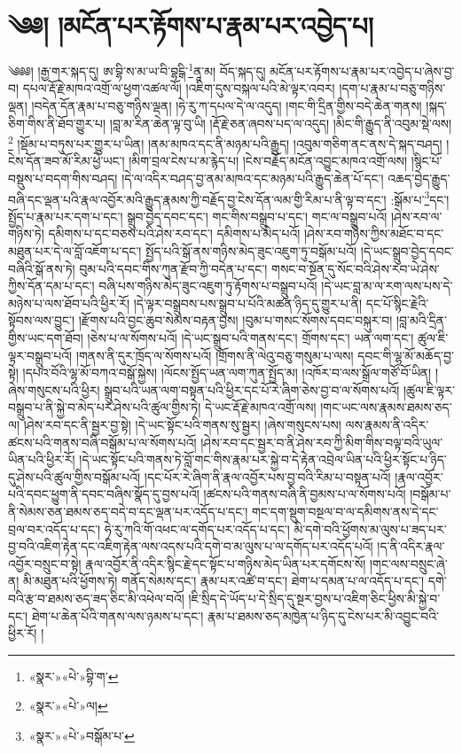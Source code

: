 \chapter{༄༅། །མངོན་པར་རྟོགས་པ་རྣམ་པར་འབྱེད་པ།}༄༅༅། །རྒྱ་གར་སྐད་དུ། ཨ་བྷི་ས་མ་ཡ་བི་བྷངྒི་\footnote{«སྣར་»«པེ་»བྷི་ག་}ནཱ་མ། བོད་སྐད་དུ། མངོན་པར་རྟོགས་པ་རྣམ་པར་འབྱེད་པ་ཞེས་བྱ་བ། དཔལ་རྡོ་རྗེ་མཁའ་འགྲོ་ལ་ཕྱག་འཚལ་ལོ། །འཇིག་དུས་བསྐལ་པའི་མེ་ལྟར་འབར། །དག་པ་རྣམ་པ་བཅུ་གཉིས་ལྡན། །བདེན་དོན་རྣམ་པ་བཅུ་གཉིས་ལྡན། །ཧེ་རུ་ཀ་དཔལ་དེ་ལ་འདུད། །གང་གི་དྲིན་གྱིས་བདེ་ཆེན་གནས། །སྐད་ཅིག་གིས་ནི་ཐོབ་གྱུར་པ། །བླ་མ་རིན་ཆེན་ལྟ་བུ་ཡི། །རྡོ་རྗེ་ཅན་ཞབས་པད་ལ་འདུད། །མིང་གི་རྒྱུད་ནི་འབུམ་སྡེ་ལས།\footnote{«སྣར་»«པེ་»ལ།} །སྡོམ་པ་བཏུས་པར་གྱུར་པ་ཡིན། །ནམ་མཁའ་དང་ནི་མཉམ་པའི་རྒྱུད། །འབུམ་གཅིག་ནང་ནས་དེ་སྐད་བཤད། །ངེས་དོན་ཟབ་མོ་རིམ་ཕྱེ་ཡང་། །མིག་བྲལ་ངེས་པ་མ་རྙེད་པ། །ངེས་བརྗོད་མངོན་འབྱུང་མཁའ་འགྲོ་ལས། །སྙིང་པོ་བསྡུས་པ་བདག་གིས་བཤད། །དེ་ལ་འདིར་བཤད་བྱ་ནམ་མཁའ་དང་མཉམ་པའི་རྒྱུད་ཆེན་པོ་དང་། འཆད་བྱེད་རྒྱུད་བཞི་དང་ལྡན་པའི་རྣལ་འབྱོར་མའི་རྒྱུད་རྣམས་ཀྱི་བརྗོད་བྱ་ངེས་དོན་ལམ་གྱི་རིམ་པ་ནི་ལྟ་བ་དང་། :སྒོམ་པ་\footnote{«སྣར་»«པེ་»བསྒོམ་པ་}དང་། སྤྱོད་པ་རྣམ་པར་དག་པ་དང་། སྒྲུབ་བྱེད་དབང་དང་། གང་གིས་བསྒྲུབ་པ་དང་། གང་ལ་བསྒྲུབ་པའོ། །ཤེས་རབ་ལ་གཉིས་ཏེ། དམིགས་པ་དང་བཅས་པའི་ཤེས་རབ་དང་། དམིགས་པ་མེད་པའོ། །ཤེས་རབ་གཉིས་ཀྱིས་མཐོང་བ་དང་མཐུན་པར་དེ་ལ་བློ་འཇོག་པ་དང་། སྤྱོད་པའི་སྒོ་ནས་གཉིས་མེད་ཟུང་འཇུག་ཏུ་བསྒོམ་པའོ། །དེ་ཡང་སྒྲུབ་བྱེད་དབང་བཞིའི་སྒོ་ནས་ཏེ། བུམ་པའི་དབང་གིས་ཀུན་རྫོབ་ཀྱི་བདེན་པ་དང་། གསང་བ་སྔོན་དུ་སོང་བའི་ཤེས་རབ་ཡེ་ཤེས་ཀྱིས་དོན་དམ་པ་དང་། བཞི་པས་གཉིས་མེད་ཟུང་འཇུག་ཏུ་རྟོགས་པ་བསྒྲུབ་པའོ། །དེ་ཡང་བླ་མ་ལ་རག་ལས་པས་དེ་མཉེས་པ་ལས་ཐོབ་པའི་ཕྱིར་རོ། །དེ་ལྟར་བསྒྲུབས་པས་སྒྲུབ་པ་པོའི་མཚན་ཉིད་དུ་གྱུར་པ་ནི། དང་པོ་སྙིང་རྗེའི་སྟོབས་ལས་བྱུང་། །རྫོགས་པའི་བྱང་ཆུབ་སེམས་བརྟན་བྱས། །བུམ་པ་གསང་སོགས་དབང་བསྐུར་བ། །བླ་མའི་དྲིན་གྱིས་ཡང་དག་ཐོབ། །ཅེས་པ་ལ་སོགས་པའོ། །དེ་ཡང་སྒྲུབ་པའི་གནས་དང་། གྲོགས་དང་། ཡན་ལག་དང་། ཚུལ་ཇི་ལྟར་བསྒྲུབ་པའོ། །གནས་ནི་དུར་ཁྲོད་ལ་སོགས་པའོ། །གྲོགས་ནི་ལེའུ་བཅུ་གསུམ་པ་ལས། དབང་གི་ལྷ་མོ་མཆོད་བྱ་སྟེ། །དཔའ་བོའི་ལྷ་མོ་བཀའ་བསྒོ་སྐྱེས། །ལོངས་སྤྱོད་ཡན་ལག་ཀུན་སྤྱོད་མ། །འཁོར་བ་ལས་སྒྲོལ་གཙོ་བོ་ཡིན། །ཞེས་གསུངས་པའི་ཕྱིར། སྒྲུབ་པའི་ཡན་ལག་བསྟན་པའི་ཕྱིར་དང་པོ་རེ་ཞིག་ཅེས་བྱ་བ་ལ་སོགས་པའོ། །ཚུལ་ཇི་ལྟར་བསྒྲུབ་པ་ནི་སྐྱེ་བ་མེད་པར་ཤེས་པའི་ཚུལ་གྱིས་ཏེ། དེ་ཡང་རྡོ་རྗེ་མཁའ་འགྲོ་ལས། །གང་ཡང་ལས་རྣམས་ཐམས་ཅད་ལ། །ཤེས་རབ་དང་ནི་སྦྱར་བྱ་སྟེ། །དེ་ཡང་སྟོང་པའི་གནས་སུ་སྦྱར། །ཞེས་གསུངས་པས། ལས་རྣམས་ནི་འདིར་ཚངས་པའི་གནས་བཞི་བསྒོམ་པ་ལ་སོགས་པའོ། །ཤེས་རབ་དང་སྦྱར་བ་ནི་ཤེས་རབ་ཀྱི་མིག་གིས་བལྟ་བའི་ཡུལ་ཡིན་པའི་ཕྱིར་རོ། །དེ་ཡང་སྟོང་པའི་གནས་ཏེ་བློ་གང་གིས་རྣམ་པར་སྐྱེ་བ་དེ་རྟེན་འབྲེལ་ཡིན་པའི་ཕྱིར་སྟོང་པ་ཉིད་དུ་ཤེས་པའི་ཚུལ་གྱིས་བསྒོམ་པའོ། །དང་པོར་རེ་ཞིག་ནི་རྣལ་འབྱོར་པས་བྱ་བའི་རིམ་པ་བསྟན་པའོ། །རྣལ་འབྱོར་པའི་དབང་ཕྱུག་ནི་དབང་བཞིས་སྣོད་དུ་བྱས་པའོ། །ཚངས་པའི་གནས་བཞི་ནི་བྱམས་པ་ལ་སོགས་པའོ། །བསྒོམ་པ་ནི་སེམས་ཅན་ཐམས་ཅད་བདེ་བ་དང་ལྡན་པར་འདོད་པ་དང་། གང་དག་སྡུག་བསྔལ་བ་ལ་དམིགས་ནས་དེ་དང་བྲལ་བར་འདོད་པ་དང་། ཧེ་རུ་ཀའི་གོ་འཕང་ལ་དགོད་པར་འདོད་པ་དང་། མི་དགེ་བའི་ཕྱོགས་མ་ལུས་པ་ཟད་པར་བྱ་བའི་འཇིག་རྟེན་དང་འཇིག་རྟེན་ལས་འདས་པའི་དགེ་བ་མ་ལུས་པ་ལ་དགོད་པར་འདོད་པའོ། །ད་ནི་འདིར་རྣལ་འབྱོར་བསྲུང་བ་སྟེ། རྣལ་འབྱོར་ནི་འདིར་སྙིང་རྗེ་དང་སྟོང་པ་གཉིས་མེད་ཡིན་པར་དགོངས་སོ། །གང་ལས་བསྲུང་ཞེ་ན། མི་མཐུན་པའི་ཕྱོགས་ཏེ། གནོད་སེམས་དང་། རྣམ་པར་འཚེ་བ་དང་། ཐེག་པ་དམན་པ་ལ་འདོད་པ་དང་། དགེ་བའི་རྩ་བ་ཐམས་ཅད་ཟད་ཅིང་མི་འཕེལ་བའོ། །ཇི་སྲིད་དེ་ཡོད་པ་དེ་སྲིད་དུ་སྔར་བྱས་པ་འཇིག་ཅིང་ཕྱིས་མི་སྐྱེ་བ་དང་། ཐེག་པ་ཆེན་པོའི་གནས་ལས་ཉམས་པ་དང་། རྣམ་པ་ཐམས་ཅད་མཁྱེན་པ་ཉིད་དུ་ངེས་པར་མི་འབྱུང་བའི་ཕྱིར་རོ། །
